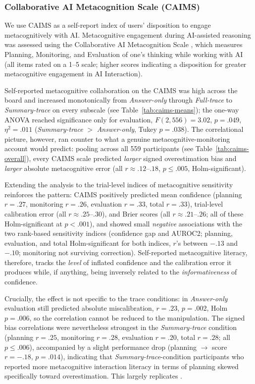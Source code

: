 \documentclass[manuscript, anonymous=false,authorversion,review=false]{acmart}
\begin{document}
\subsubsection{Collaborative AI Metacognition Scale (CAIMS)}
We use CAIMS as a self-report index of users' disposition to engage metacognitively with AI.
Metacognitive engagement during AI-assisted reasoning was assessed using the Collaborative AI Metacognition Scale \cite{Sidra03042026}, which measures Planning, Monitoring, and Evaluation of one's thinking while working with AI (all items rated on a 1--5 scale; higher scores indicating a disposition for greater metacognitive engagement in AI Interaction).

Self-reported metacognitive collaboration on the CAIMS was high across the board and increased monotonically from \textit{Answer-only} through \textit{Full-trace} to \textit{Summary-trace} on every
subscale (see Table~\ref{tab:caims-means}); the one-way ANOVA reached
significance only for evaluation, $F(2, 556) = 3.02$, $p = .049$,
$\eta^2 = .011$ (\textit{Summary-trace} $>$ \textit{Answer-only}, Tukey $p = .038$). The correlational picture, however, ran counter to what a genuine
metacognitive-monitoring account would predict: pooling across all 559 participants (see Table~\ref{tab:caims-overall}), every CAIMS scale
predicted \emph{larger} signed overestimation bias and \emph{larger} absolute metacognitive error (all $r \approx .12$--$.18$,
$p \leq .005$, Holm-significant).

Extending the analysis to the trial-level indices of metacognitive sensitivity reinforces the pattern: CAIMS
positively predicted mean confidence (planning $r = .27$, monitoring $r = .26$, evaluation $r = .33$, total $r = .33$), trial-level calibration error (all $r \approx .25$--$.30$), and Brier scores (all $r \approx .21$--$.26$; all of these Holm-significant at
$p < .001$), and showed small \emph{negative} associations with the two rank-based sensitivity indices (confidence gap and AUROC2; planning, evaluation, and total Holm-significant for both indices, $r$'s between $-.13$ and $-.10$; monitoring not surviving correction). Self-reported metacognitive literacy, therefore, tracks the \emph{level} of inflated confidence and the calibration error it
produces while, if anything, being inversely related to the \emph{informativeness} of confidence.

Crucially, the effect is not specific to the trace conditions: in
\textit{Answer-only} evaluation still predicted absolute miscalibration, $r = .23$, $p = .002$,
Holm $p = .006$, so the correlation cannot be reduced to the manipulation. The signed bias correlations were nevertheless
strongest in the \textit{Summary-trace} condition (planning $r = .25$, monitoring $r = .28$, evaluation $r = .20$, total $r = .28$; all $p \leq .006$),
accompanied by a slight performance drop (planning $\rightarrow$ score $r = -.18$, $p = .014$), indicating that \textit{Summary-trace}-condition participants who reported more metacognitive interaction literacy in terms of planning skewed specifically toward overestimation. This largely replicates \citet{FERNANDES2026108779}.
\end{document}
